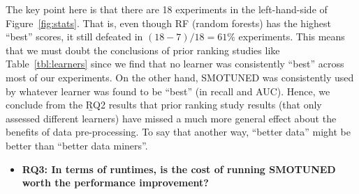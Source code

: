 \documentclass[sigconf,review, anonymous]{acmart}
\newcommand{\bi}{\begin{itemize}[leftmargin=0.4cm]}
\newcommand{\ei}{\end{itemize}}
\theoremstyle{break}
\theoremstyle{break}
\newcommand{\sma}{{\sc SMOTE}}
\newcommand{\smb}{{\sc SMOTUNED}}
\begin{document}
The key point here is that there are 18 experiments in the left-hand-side of Figure~\ref{fig:stats}. That is,
even though RF (random forests) has the highest  ``best'' scores, it still defeated in \mbox{$(18-7)/18=61\%$}
experiments. This means that we must doubt the conclusions of prior ranking studies like 
 Table~\ref{tbl:learners} since we find that no   learner was  consistently  ``best''  across most of our experiments.
On the other hand, 
  {\smb} was  consistently  used  by  whatever  learner  was  found  to  be ``best'' (in recall and AUC). 
Hence, we conclude from the {\b RQ2} results that  prior ranking study results (that only assessed different learners) have missed a much more general effect about the benefits of data pre-processing.
To say that another way, ``better data'' might be better than ``better data miners''.



\bi
\item {\bf RQ3: In  terms  of  runtimes,  is  the  cost  of  running  {\smb} worth the performance improvement?}
\ei
\end{document}
